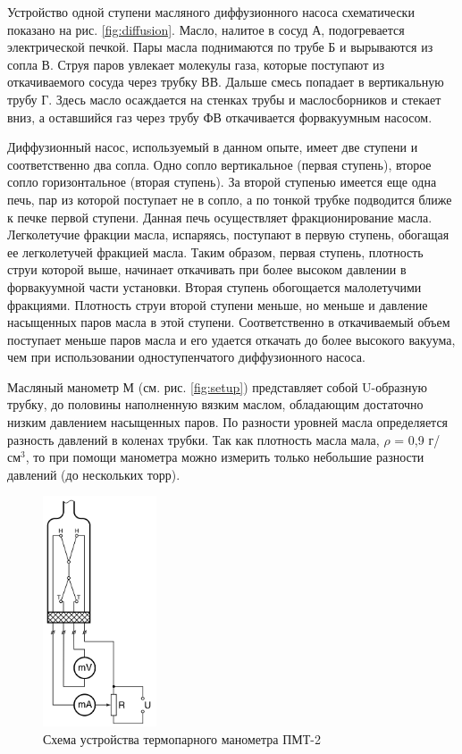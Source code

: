 \documentclass[a4paper,12pt]{article} %
\begin{document}
Устройство одной ступени масляного диффузионного насоса схематически показано на рис. \ref{fig:diffusion}. Масло, налитое в сосуд А, подогревается электрической печкой. Пары масла поднимаются по трубе Б и вырываются из сопла В. Струя паров увлекает молекулы газа, которые поступают из откачиваемого сосуда через трубку ВВ. Дальше смесь попадает в вертикальную трубу Г. Здесь масло осаждается на стенках трубы и маслосборников и стекает вниз, а оставшийся газ через трубу ФВ откачивается форвакуумным насосом.

Диффузионный насос, используемый в данном опыте, имеет две ступени и соответственно два сопла. Одно сопло вертикальное (первая ступень), второе сопло горизонтальное (вторая ступень). За второй ступенью имеется еще одна печь, пар из которой поступает не в сопло, а по тонкой трубке подводится ближе к печке первой ступени. Данная печь осуществляет фракционирование масла. Легколетучие фракции масла, испаряясь, поступают в первую ступень, обогащая ее легколетучей фракцией масла. Таким образом, первая ступень, плотность струи которой выше, начинает откачивать при более высоком давлении в форвакуумной части установки. Вторая ступень обогощается малолетучими фракциями. Плотность струи второй ступени меньше, но меньше и давление насыщенных паров масла в этой ступени. Соответственно в откачиваемый объем поступает меньше паров масла и его удается откачать до более высокого вакуума, чем при использовании одноступенчатого диффузионного насоса.

Масляный манометр М (см. рис. \ref{fig:setup}) представляет собой U-образную трубку, до половины наполненную вязким маслом, обладающим достаточно низким давлением насыщенных паров. По разности уровней масла определяется разность давлений в коленах трубки. Так как плотность масла мала, $ \rho $ = 0,9 г/$\text{см}^3$, то при помощи манометра можно измерить только небольшие разности давлений (до нескольких торр).

\begin{figure}
    \centering
    \includegraphics[width = 0.3\textwidth]{thermo.PNG}
    \caption{Схема устройства термопарного манометра ПМТ-2}
    \label{fig:thermo}
\end{figure}
\end{document}
